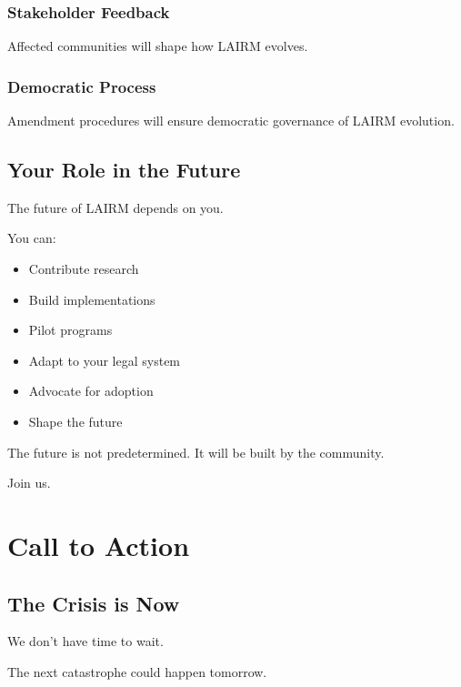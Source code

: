 \documentclass[12pt,a4paper,twoside,openright]{book}
\begin{document}
\subsection{Stakeholder Feedback}

Affected communities will shape how LAIRM evolves.

\subsection{Democratic Process}

Amendment procedures will ensure democratic governance of LAIRM evolution.

\section{Your Role in the Future}

The future of LAIRM depends on you.

You can:
\begin{itemize}
    \item Contribute research
    \item Build implementations
    \item Pilot programs
    \item Adapt to your legal system
    \item Advocate for adoption
    \item Shape the future
\end{itemize}

The future is not predetermined. It will be built by the community.

Join us.

\cleardoublepage

\chapter{Call to Action}
\label{ch:action}

\section{The Crisis is Now}

We don't have time to wait.

The next catastrophe could happen tomorrow.
\end{document}

